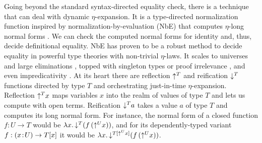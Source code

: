 \documentclass[acmsmall%
]{acmart}\settopmatter{printfolios=true}
\begin{document}
Going beyond the standard syntax-directed equality check, there is a
technique that can deal with dynamic $\eta$-expansion.  It is a
type-directed normalization function inspired by
normalization-by-evaluation (NbE) that computes $\eta$-long normal
forms \cite{bergerSchwichtenberg:lics91,danvy:tdpe}.  We can check the
computed normal forms for identity and, thus, decide definitional
equality.  NbE has proven to be a robust method to decide equality in
powerful type theories with non-trivial $\eta$-laws.  It scales to
universes and large eliminations \cite{abelCoquandDybjer:lics07},
topped with singleton types or proof irrelevance
\cite{abelCoquandPagano:lmcs11}, and even impredicativity
\cite{abel:flops10}.  At its heart there are reflection $\mathord{\uparrow^{T}}$ and
reification $\mathord{\downarrow^{T}}$ functions directed by type $T$ and orchestrating
just-in-time $\eta$-expansion.  Reflection $\mathord{\uparrow^{T}} x$ maps variables
$x$ into the realm of values of type $T$ and lets us compute with
open terms.  Reification $\mathord{\downarrow^{T}} a$ takes a value $a$ of type $T$ and
computes its long normal form.  For instance, the normal form of a
closed function $f : U \to T$ would be
$\lambda x.\,\mathord{\downarrow^{T}} (f\,(\mathord{\uparrow^{U}} x))$, and for its dependently-typed
variant $f : (x \!:\! U) \to T[x]$ it would be
$\lambda x.\,\mathord{\downarrow^{T[\mathord{\uparrow^{U}} x]}} (f\,(\mathord{\uparrow^{U}} x))$.

\end{document}
